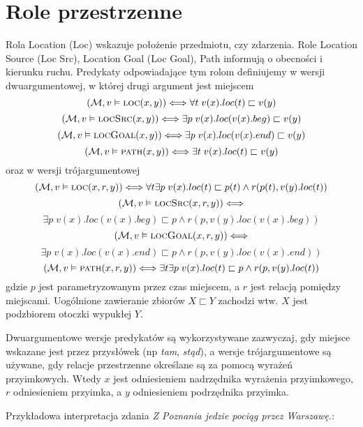 \documentclass[a4paper,12pt]{article}
\newcommand{\loc}[3]{\text{{\sc loc}}(#1,#2,#3)}
\newcommand{\locsrc}[3]{\text{{\sc locSrc}}(#1,#2,#3)}
\newcommand{\locgoal}[3]{\text{{\sc locGoal}}(#1,#2,#3)}
\newcommand{\path}[3]{\text{{\sc path}}(#1,#2,#3)}
\newcommand{\locA}[2]{\text{{\sc loc}}(#1,#2)}
\newcommand{\locsrcA}[2]{\text{{\sc locSrc}}(#1,#2)}
\newcommand{\locgoalA}[2]{\text{{\sc locGoal}}(#1,#2)}
\newcommand{\pathA}[2]{\text{{\sc path}}(#1,#2)}
\begin{document}
\section{Role przestrzenne}
Rola Location (Loc) wskazuje położenie przedmiotu, czy zdarzenia.
Role Location Source (Loc Src), Location Goal (Loc Goal), Path informują o obecności i kierunku ruchu.
Predykaty odpowiadające tym rolom definiujemy w wersji dwuargumentowej, w której drugi argument jest miejscem %
\[({\cal M},v\vDash \locA{x}{y}) \Longleftrightarrow \forall t \; v(x).loc(t)\sqsubset v(y)\]
\[({\cal M},v\vDash \locsrcA{x}{y}) \Longleftrightarrow \exists p\; v(x).loc(v(x).beg)\sqsubset v(y)\]%
\[({\cal M},v\vDash \locgoalA{x}{y}) \Longleftrightarrow \exists p\; v(x).loc(v(x).end)\sqsubset v(y)\]%
\[({\cal M},v\vDash \pathA{x}{y}) \Longleftrightarrow \exists t \; v(x).loc(t)\sqsubset v(y)\]
oraz w wersji trójargumentowej
\[({\cal M},v\vDash \loc{x}{r}{y}) \Longleftrightarrow \forall t\exists p \; v(x).loc(t)\sqsubset p(t) \wedge r(p(t),v(y).loc(t))\]
\[({\cal M},v\vDash \locsrc{x}{r}{y}) \Longleftrightarrow \]\[\exists p\; v(x).loc(v(x).beg)\sqsubset p \wedge r(p,v(y).loc(v(x).beg))\]
\[({\cal M},v\vDash \locgoal{x}{r}{y}) \Longleftrightarrow \]\[\exists p\; v(x).loc(v(x).end)\sqsubset p \wedge r(p,v(y).loc(v(x).end))\]
\[({\cal M},v\vDash \path{x}{r}{y}) \Longleftrightarrow \exists t\exists p \; v(x).loc(t)\sqsubset p \wedge r(p,v(y).loc(t))\]
gdzie $p$ jest parametryzowanym przez czas miejscem, a $r$ jest relacją pomiędzy miejscami.
Uogólnione zawieranie zbiorów $X\sqsubset Y$ zachodzi wtw. $X$ jest podzbiorem otoczki wypukłej $Y$.%

Dwuargumentowe wersje predykatów są wykorzystywane zazwyczaj, gdy miejsce wskazane jest przez przysłówek (np {\it tam}, {\it stąd}),
a wersje trójargumentowe są używane, gdy relacje przestrzenne określane są za pomocą wyrażeń przyimkowych. 
Wtedy $x$ jest odniesieniem nadrzędnika wyrażenia przyimkowego,
$r$ odniesieniem przyimka, a $y$ odniesieniem podrzędnika przyimka.

Przykładowa interpretacja zdania {\it Z Poznania jedzie pociąg przez Warszawę.}:
\end{document}
